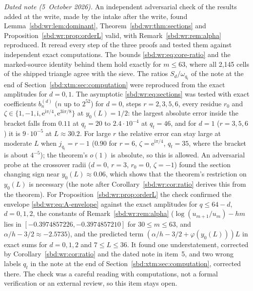 \documentclass[11pt,a4paper]{article}
\theoremstyle{definition}
\newcommand{\e}{\mathrm e}
\newcommand{\ii}{\mathrm i}
\begin{document}
\begin{enumerate}[label=\textbf{\arabic*.},leftmargin=*]
\emph{Dated note (5~October 2026).} An independent adversarial check of the
results added at the write, made by the intake after the write, found
Lemma~\ref{sbd:wr:lem:dominant}, Theorem~\ref{sbd:wr:thm:sections} and
Proposition~\ref{sbd:wr:prop:orderL} valid, with Remark~\ref{sbd:wr:rem:alpha}
reproduced. It reread every step of the three proofs and tested them
against independent exact computations. The bounds
\eqref{sbd:wr:eq:core-ratio} and the marked-source identity behind them hold
exactly for $m\le63$, where all 2{,}145 cells of the shipped triangle agree
with the sieve. The ratios $S_d/\omega_{q_t}$ of the note at the end of
Section~\ref{sbd:xtm:sec:computation} were reproduced from the exact
amplitudes for $d=0,1$. The asymptotic \eqref{sbd:wr:eq:sections} was
tested with exact coefficients $b_n^{(d)}$ ($n$ up to $2^{52}$) for $d=0$,
steps $r=2,3,5,6$, every residue $r_0$ and
$\zeta\in\{1,-1,\ii,\e^{\ii\pi/4},\e^{3\ii\pi/8}\}$ at $y_0(L)=1/2$: the
largest absolute error inside the bracket falls from $0.11$ at $q_t=20$ to
$2.4\cdot10^{-4}$ at $q_t=46$, and for $d=1$ ($r=3,5,6$) it is
$9\cdot10^{-5}$ at $L\approx30.2$. For large $r$ the relative error can stay
large at moderate $L$ when $j_{q_t}=r-1$ ($0.90$ for $r=6$,
$\zeta=\e^{\ii\pi/4}$, $q_t=35$, where the bracket is about $4^{-5}$); the
theorem's $o(1)$ is absolute, so this is allowed. An adversarial probe at the
crossover radii ($d=0$, $r=3$, $r_0=0$, $\zeta=-1$) found the section
changing sign near $y_0(L)\approx0.06$, which shows that the theorem's
restriction on $y_0(L)$ is necessary (the note after
Corollary~\ref{sbd:wr:cor:ratio} derives this from the theorem). For
Proposition~\ref{sbd:wr:prop:orderL} the check confirmed the envelope
\eqref{sbd:wr:eq:A-envelope} against the exact amplitudes for $q\le64-d$,
$d=0,1,2$, the constants of
Remark~\ref{sbd:wr:rem:alpha} ($\log(u_{m+1}/u_m)-hm$ lies in
$[-0.3974857226,-0.3974857210]$ for $30\le m\le63$, and
$\alpha/h-3/2\approx-2.5735$), and the predicted term
$(\alpha/h-3/2+\varphi(y_0(L)))L$ in exact sums for $d=0,1,2$ and
$7\le L\le36$. It found one understatement, corrected by
Corollary~\ref{sbd:wr:cor:ratio} and the dated note in item~5, and two
wrong labels $q_t$ in the note at the end of
Section~\ref{sbd:xtm:sec:computation}, corrected there. The check was a
careful reading with computations, not a formal verification or an
external review, so this item stays open.
\end{enumerate}
\end{document}

